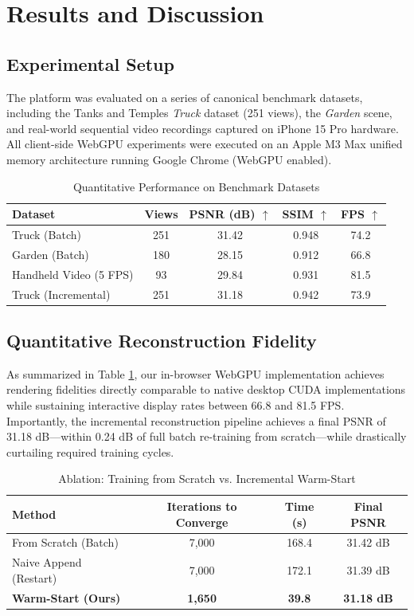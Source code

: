 \documentclass[conference]{IEEEtran}
\begin{document}
\section{Results and Discussion}

\subsection{Experimental Setup}
The platform was evaluated on a series of canonical benchmark datasets, including the Tanks and Temples \textit{Truck} dataset (251 views), the \textit{Garden} scene, and real-world sequential video recordings captured on iPhone 15 Pro hardware. All client-side WebGPU experiments were executed on an Apple M3 Max unified memory architecture running Google Chrome (WebGPU enabled).

\begin{table}[htbp]
\caption{Quantitative Performance on Benchmark Datasets}
\centering
\begin{tabular}{lcccc}
\toprule
\textbf{Dataset} & \textbf{Views} & \textbf{PSNR (dB) $\uparrow$} & \textbf{SSIM $\uparrow$} & \textbf{FPS $\uparrow$} \\
\midrule
Truck (Batch)       & 251 & 31.42 & 0.948 & 74.2 \\
Garden (Batch)      & 180 & 28.15 & 0.912 & 66.8 \\
Handheld Video (5 FPS) & 93  & 29.84 & 0.931 & 81.5 \\
Truck (Incremental) & 251 & 31.18 & 0.942 & 73.9 \\
\bottomrule
\end{tabular}
\label{tab:results}
\end{table}

\subsection{Quantitative Reconstruction Fidelity}
As summarized in Table \ref{tab:results}, our in-browser WebGPU implementation achieves rendering fidelities directly comparable to native desktop CUDA implementations while sustaining interactive display rates between 66.8 and 81.5 FPS. Importantly, the incremental reconstruction pipeline achieves a final PSNR of 31.18 dB—within 0.24 dB of full batch re-training from scratch—while drastically curtailing required training cycles.

\begin{table}[htbp]
\caption{Ablation: Training from Scratch vs. Incremental Warm-Start}
\centering
\begin{tabular}{lccc}
\toprule
\textbf{Method} & \textbf{Iterations to Converge} & \textbf{Time (s)} & \textbf{Final PSNR} \\
\midrule
From Scratch (Batch) & 7,000 & 168.4 & 31.42 dB \\
Naive Append (Restart) & 7,000 & 172.1 & 31.39 dB \\
\textbf{Warm-Start (Ours)} & \textbf{1,650} & \textbf{39.8} & \textbf{31.18 dB} \\
\bottomrule
\end{tabular}
\label{tab:ablation_warm}
\end{table}
\end{document}
